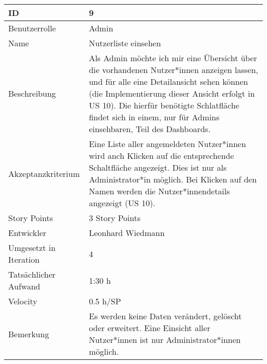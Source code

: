 \begin{tabularx}{\textwidth}{|p{}|X|}
	\hline
	ID & 9\\
	\hline
	Benutzerrolle & Admin\\
	\hline
	Name & Nutzerliste einsehen\\
	\hline
	Beschreibung & Als Admin möchte ich mir eine Übersicht über die vorhandenen Nutzer*innen anzeigen lassen, und für alle eine Detailansicht sehen können (die Implementierung dieser Ansicht erfolgt in US 10). Die hierfür benötigte Schlatfläche findet sich in einem, nur für Admins einsehbaren, Teil des Dashboards.\\
	\hline
	Akzeptanzkriterium & Eine Liste aller angemeldeten Nutzer*innen wird anch Klicken auf die entsprechende Schaltfläche angezeigt. Dies ist nur als Administrator*in möglich. Bei Klicken auf den Namen werden die Nutzer*innendetails angezeigt (US 10).\\
	\hline
	Story Points & 3 Story Points\\
	\hline
	Entwickler & Leonhard Wiedmann\\
	\hline
	Umgesetzt in Iteration & 4\\
	\hline
	Tatsächlicher Aufwand & 1:30 h\\
	\hline
	Velocity & 0.5 h/SP\\
	\hline
	Bemerkung & Es werden keine Daten verändert, gelöscht oder erweitert. Eine Einsicht aller Nutzer*innen ist nur Administrator*innen möglich.\\
	\hline
\end{tabularx}
\vspace{20pt}
